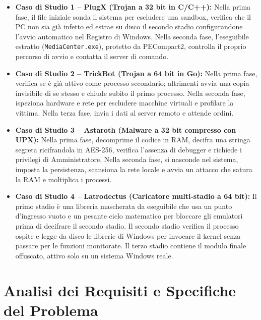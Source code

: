 \documentclass[11pt, a4paper]{article}
\begin{document}
	\begin{itemize}
		\item \textbf{Caso di Studio 1 -- PlugX (Trojan a 32 bit in C/C++):} Nella prima fase, il file iniziale sonda il sistema per escludere una sandbox, verifica che il PC non sia già infetto ed estrae su disco il secondo stadio configurandone l'avvio automatico nel Registro di Windows. Nella seconda fase, l'eseguibile estratto (\texttt{MediaCenter.exe}), protetto da PECompact2, controlla il proprio percorso di avvio e contatta il server di comando.
		
		\item \textbf{Caso di Studio 2 -- TrickBot (Trojan a 64 bit in Go):} Nella prima fase, verifica se è già attivo come processo secondario; altrimenti avvia una copia invisibile di se stesso e chiude subito il primo processo. Nella seconda fase, ispeziona hardware e rete per escludere macchine virtuali e profilare la vittima. Nella terza fase, invia i dati al server remoto e attende ordini.
		
		\item \textbf{Caso di Studio 3 -- Astaroth (Malware a 32 bit compresso con UPX):} Nella prima fase, decomprime il codice in RAM, decifra una stringa segreta ricifrandola in AES-256, verifica l'assenza di debugger e richiede i privilegi di Amministratore. Nella seconda fase, si nasconde nel sistema, imposta la persistenza, scansiona la rete locale e avvia un attacco che satura la RAM e moltiplica i processi.
		
		\item \textbf{Caso di Studio 4 -- Latrodectus (Caricatore multi-stadio a 64 bit):} Il primo stadio è una libreria mascherata da eseguibile che usa un punto d'ingresso vuoto e un pesante ciclo matematico per bloccare gli emulatori prima di decifrare il secondo stadio. Il secondo stadio verifica il processo ospite e legge da disco le librerie di Windows per invocare il kernel senza passare per le funzioni monitorate. Il terzo stadio contiene il modulo finale offuscato, attivo solo su un sistema Windows reale.
	\end{itemize}
	
	\section{Analisi dei Requisiti e Specifiche del Problema}
	
\end{document}
